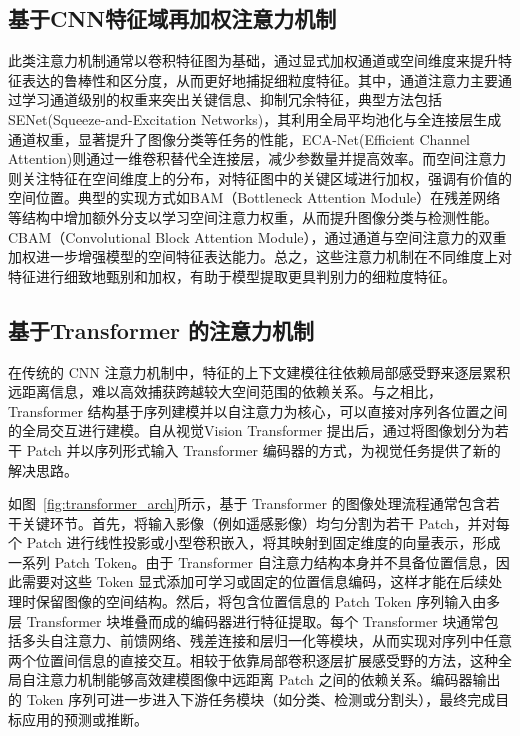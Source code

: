 \subsection{基于CNN特征域再加权注意力机制}
此类注意力机制通常以卷积特征图为基础，通过显式加权通道或空间维度来提升特征表达的鲁棒性和区分度，从而更好地捕捉细粒度特征。其中，通道注意力主要通过学习通道级别的权重来突出关键信息、抑制冗余特征，典型方法包括 SENet(Squeeze-and-Excitation Networks)\cite{senet}，其利用全局平均池化与全连接层生成通道权重，显著提升了图像分类等任务的性能，ECA-Net(Efficient Channel Attention)\cite{eca-net}则通过一维卷积替代全连接层，减少参数量并提高效率。而空间注意力则关注特征在空间维度上的分布，对特征图中的关键区域进行加权，强调有价值的空间位置。典型的实现方式如BAM（Bottleneck Attention Module）\cite{bam}在残差网络等结构中增加额外分支以学习空间注意力权重，从而提升图像分类与检测性能。CBAM（Convolutional Block Attention Module）\cite{cbam}，通过通道与空间注意力的双重加权进一步增强模型的空间特征表达能力。总之，这些注意力机制在不同维度上对特征进行细致地甄别和加权，有助于模型提取更具判别力的细粒度特征。
\subsection{基于Transformer 的注意力机制}
\label{sec:transformer_attn}
在传统的 CNN 注意力机制中，特征的上下文建模往往依赖局部感受野来逐层累积远距离信息，难以高效捕获跨越较大空间范围的依赖关系。与之相比，Transformer 结构\cite{vaswani2017}基于序列建模并以自注意力为核心，可以直接对序列各位置之间的全局交互进行建模。自从视觉Vision Transformer\cite{dosovitskiy2020image} 提出后，通过将图像划分为若干 Patch 并以序列形式输入 Transformer 编码器的方式，为视觉任务提供了新的解决思路。

如图~\ref{fig:transformer_arch}所示，基于 Transformer 的图像处理流程通常包含若干关键环节。首先，将输入影像（例如遥感影像）均匀分割为若干 Patch，并对每个 Patch 进行线性投影或小型卷积嵌入，将其映射到固定维度的向量表示，形成一系列 Patch Token。由于 Transformer 自注意力结构本身并不具备位置信息，因此需要对这些 Token 显式添加可学习或固定的位置信息编码，这样才能在后续处理时保留图像的空间结构。然后，将包含位置信息的 Patch Token 序列输入由多层 Transformer 块堆叠而成的编码器进行特征提取。每个 Transformer 块通常包括多头自注意力、前馈网络、残差连接和层归一化等模块，从而实现对序列中任意两个位置间信息的直接交互。相较于依靠局部卷积逐层扩展感受野的方法，这种全局自注意力机制能够高效建模图像中远距离 Patch 之间的依赖关系。编码器输出的 Token 序列可进一步进入下游任务模块（如分类、检测或分割头），最终完成目标应用的预测或推断。

